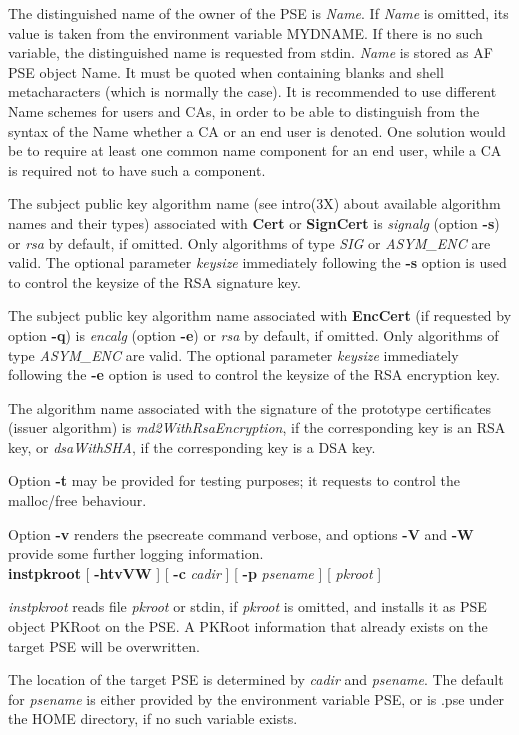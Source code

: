 The distinguished name of the owner of the PSE is {\em Name}. 
If {\em Name} is omitted, its value is taken from the environment variable MYDNAME. If there is no
such variable, the distinguished name is requested from 
stdin. {\em Name} is stored as AF PSE object Name. 
It must be quoted when containing blanks and shell metacharacters (which is normally the case).
It is recommended to use different Name schemes for users and CAs, in order to be 
able to distinguish from the syntax of the Name whether a CA or an end user is denoted.
One solution would be to require at least one common name component
for an end user, while a CA is required not to have such a component. 
 
The subject public key algorithm name (see intro(3X) about available 
algorithm names and their types) associated with {\bf Cert} or {\bf SignCert} is {\em signalg} 
(option {\bf -s}) or {\em rsa} by default, if omitted. Only algorithms of type {\em SIG} or {\em ASYM\_ENC} are valid. 
The optional parameter {\em keysize} immediately following the {\bf -s} option is used to control
the keysize of the RSA signature key.

The subject public key algorithm name associated with {\bf EncCert} (if requested by option {\bf -q})
is {\em encalg} (option {\bf -e}) or {\em rsa} by default, 
if omitted. Only algorithms of type {\em ASYM\_ENC} are valid. The optional
parameter {\em keysize} immediately following the {\bf -e} option is used to control
the keysize of the RSA encryption key.

The algorithm name associated with the signature of the prototype certificates 
(issuer algorithm) is {\em md2WithRsaEncryption}, if the corresponding key is an RSA key,
or {\em dsaWithSHA}, if the corresponding key is a DSA key. 

Option {\bf -t} may be provided for testing purposes; it requests to control the malloc/free behaviour.

Option {\bf -v} renders the psecreate command verbose, and options {\bf -V} and {\bf -W} 
provide some further logging
information.
\\ [1em]
{\bf instpkroot} [ {\bf -htvVW} ] [ {\bf -c} {\em cadir} ] [ {\bf -p} {\em psename} ] [ {\em pkroot} ]

{\em instpkroot} reads file {\em pkroot} or stdin, if {\em pkroot} is omitted, and installs it as
PSE object PKRoot on the PSE. A PKRoot information that already exists on the target PSE will
be overwritten.
 
The location of the target PSE is determined by {\em cadir} and {\em psename}. The default for {\em 
psename} is either provided by the environment variable PSE, or is .pse under the HOME directory, 
if no such variable exists.
 
